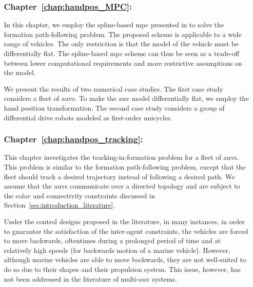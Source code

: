 \subsubsection{Chapter~\ref{chap:handpos_MPC}: }

In this chapter, we employ the spline-based \gls{mpc} presented in \cite{saska_2016_predictive,van_parys_2017_DMPC} to solve the formation path-following problem.
The proposed scheme is applicable to a wide range of vehicles.
The only restriction is that the model of the vehicle must be differentially flat.
The spline-based \gls{mpc} scheme can thus be seen as a trade-off between lower computational requirements and more restrictive assumptions on the model.

We present the results of two numerical case studies.
The first case study considers a fleet of \glspl{auv}.
To make the \gls{auv} model differentially flat, we employ the hand position transformation.
The second case study considers a group of differential drive robots modeled as first-order unicycles.

\subsubsection{Chapter~\ref{chap:handpos_tracking}: }

This chapter investigates the tracking-in-formation problem for a fleet of \glspl{auv}.
This problem is similar to the formation path-following problem, except that the fleet should track a desired trajectory instead of following a desired path.
We assume that the \glspl{auv} communicate over a directed topology and are subject to the \gls{colav} and connectivity constraints discussed in Section~\ref{sec:introduction_literature}.

Under the control designs proposed in the literature, in many instances, in order to guarantee the satisfaction of the inter-agent constraints, the vehicles are forced to move backwards, oftentimes during a prolonged period of time and at relatively high speeds (for backwards motion of a marine vehicle). 
However, although marine vehicles are able to move backwards, they are not well-suited to do so due to their shapes and their propulsion system. 
This issue, however, has not been addressed in the literature of multi-\gls{auv} systems.

